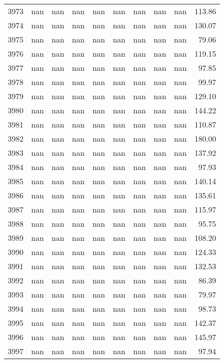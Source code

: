 \begin{tabular}{lrrrrrrrrr}
3973 & nan & nan & nan & nan & nan & nan & nan & nan & 113.86 \\
3974 & nan & nan & nan & nan & nan & nan & nan & nan & 130.07 \\
3975 & nan & nan & nan & nan & nan & nan & nan & nan & 79.06 \\
3976 & nan & nan & nan & nan & nan & nan & nan & nan & 119.15 \\
3977 & nan & nan & nan & nan & nan & nan & nan & nan & 97.85 \\
3978 & nan & nan & nan & nan & nan & nan & nan & nan & 99.97 \\
3979 & nan & nan & nan & nan & nan & nan & nan & nan & 129.10 \\
3980 & nan & nan & nan & nan & nan & nan & nan & nan & 144.22 \\
3981 & nan & nan & nan & nan & nan & nan & nan & nan & 110.87 \\
3982 & nan & nan & nan & nan & nan & nan & nan & nan & 180.00 \\
3983 & nan & nan & nan & nan & nan & nan & nan & nan & 137.92 \\
3984 & nan & nan & nan & nan & nan & nan & nan & nan & 97.93 \\
3985 & nan & nan & nan & nan & nan & nan & nan & nan & 140.14 \\
3986 & nan & nan & nan & nan & nan & nan & nan & nan & 135.61 \\
3987 & nan & nan & nan & nan & nan & nan & nan & nan & 115.97 \\
3988 & nan & nan & nan & nan & nan & nan & nan & nan & 95.75 \\
3989 & nan & nan & nan & nan & nan & nan & nan & nan & 108.20 \\
3990 & nan & nan & nan & nan & nan & nan & nan & nan & 124.33 \\
3991 & nan & nan & nan & nan & nan & nan & nan & nan & 132.53 \\
3992 & nan & nan & nan & nan & nan & nan & nan & nan & 86.39 \\
3993 & nan & nan & nan & nan & nan & nan & nan & nan & 79.97 \\
3994 & nan & nan & nan & nan & nan & nan & nan & nan & 98.73 \\
3995 & nan & nan & nan & nan & nan & nan & nan & nan & 142.37 \\
3996 & nan & nan & nan & nan & nan & nan & nan & nan & 145.97 \\
3997 & nan & nan & nan & nan & nan & nan & nan & nan & 97.94 \\

\end{tabular}
